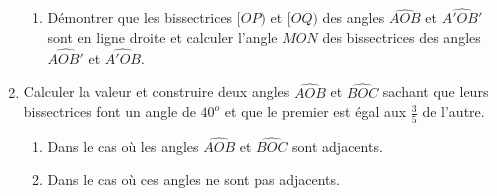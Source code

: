 \begin{enumerate}
\begin{enumerate}
\item Démontrer que les bissectrices $[OP)$ et $[OQ)$ des angles $\widehat{AOB}$ et $\widehat{A'OB'}$ sont en ligne droite et calculer l'angle $\widehat{MON}$ des bissectrices des angles $\widehat{AOB'}$ et $\widehat{A'OB}$. 
\end{enumerate}
\item Calculer la valeur et construire deux angles $\widehat{AOB}$ et $\widehat{BOC}$ sachant que leurs bissectrices font un angle de $40^o$ et que le premier est égal aux $\frac35$ de l'autre. \begin{enumerate}
\item Dans le cas où les angles $\widehat{AOB}$ et $\widehat{BOC}$ sont adjacents.
\item Dans le cas où ces angles ne sont pas adjacents. 
\end{enumerate}
\end{enumerate}